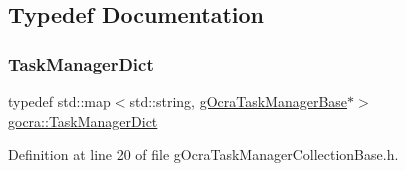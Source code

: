 \subsection{Typedef Documentation}
\hypertarget{namespacegocra_ad407175473be2e361f2937acf73ca06c}{}\label{namespacegocra_ad407175473be2e361f2937acf73ca06c} 
\subsubsection{\texorpdfstring{Task\+Manager\+Dict}{TaskManagerDict}}
{\footnotesize\ttfamily typedef std\+::map$<$std\+::string, \hyperlink{classgocra_1_1gOcraTaskManagerBase}{g\+Ocra\+Task\+Manager\+Base}$\ast$$>$ \hyperlink{namespacegocra_ad407175473be2e361f2937acf73ca06c}{gocra\+::\+Task\+Manager\+Dict}}



Definition at line 20 of file g\+Ocra\+Task\+Manager\+Collection\+Base.\+h.

